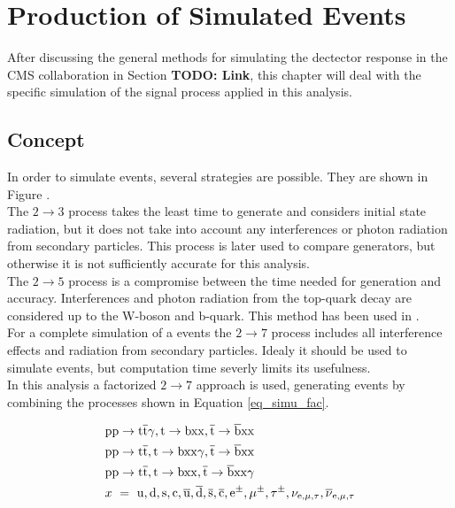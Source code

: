 \chapter{Production of Simulated Events}

After discussing the general methods for simulating the dectector response in the CMS collaboration in Section \textbf{TODO: Link}, this chapter will deal with the specific simulation of the signal process applied in this analysis. 
\section{Concept}
\label{ch_simu_con}
In order to simulate \ttgamma events, several strategies are possible. They are shown in Figure .\\
The $2 \to 3$ process takes the least time to generate and considers initial state radiation, but it does not take into account any interferences or photon radiation from secondary particles.
This process is later used to compare generators, but otherwise it is not sufficiently accurate for this analysis.\\
The $2 \to 5$ process is a compromise between the time needed for generation and accuracy. Interferences and photon radiation from the top-quark decay are considered up to the W-boson and b-quark. This method has been used in .\\
For a complete simulation of a \ttgamma events the $2 \to 7$ process includes all interference effects and radiation from secondary particles. Idealy it should be used to simulate \ttgamma events, but computation time severly limits its usefulness. \\
In this analysis a factorized $2 \to 7$ approach is used, generating events by combining the processes shown in Equation \ref{eq_simu_fac}. 

\begin{equation}
\begin{split}
& \mathrm{pp}\to \mathrm{t}\overline{\mathrm{t}} \gamma,  \mathrm{t} \to \mathrm{bxx},  \overline{\mathrm{t}} \to \overline{\mathrm{b}} \mathrm{xx} \\
& \mathrm{pp}\to \mathrm{t} \overline{\mathrm{t}},  \mathrm{t} \to \mathrm{bxx} \gamma,  \overline{\mathrm{t}} \to \overline{\mathrm{b}} \mathrm{xx} \\
& \mathrm{pp}\to \mathrm{t} \overline{\mathrm{t}},  \mathrm{t} \to \mathrm{bxx},  \overline{\mathrm{t}} \to \overline{\mathrm{b}} \mathrm{xx} \gamma \\
&  x\ = \ \mathrm{u}, \mathrm{d}, \mathrm{s}, \mathrm{c}, \overline{\mathrm{u}}, \overline{\mathrm{d}},  \overline{\mathrm{s}},  \overline{\mathrm{c}}, \mathrm{e}^{\pm}, \mu^{\pm}, \tau^{\pm}, \nu_{\mathrm{e},\mu,\tau}, \overline{\nu}_{\mathrm{e},\mu,\tau} 
\end{split}
\label{eq_simu_fac}
\end{equation}


